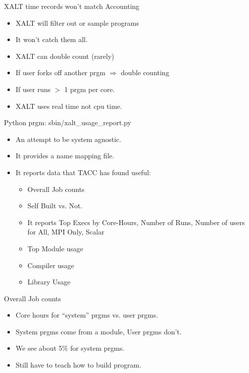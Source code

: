 \documentclass{beamer}
\begin{document}
\begin{frame}{XALT time records won't match Accounting}
  \begin{itemize}
    \item XALT will filter out or sample programs
    \item It won't catch them all.
    \item XALT can double count (rarely)
    \item If user forks off another prgm $\Rightarrow$ double counting
    \item If user runs $>$ 1 prgm per core.
    \item XALT uses real time not cpu time.
  \end{itemize}
\end{frame}

\begin{frame}{Python prgm: sbin/xalt\_usage\_report.py}
  \begin{itemize}
    \item An attempt to be system agnostic.
    \item It provides a name mapping file.
    \item It reports data that TACC has found useful:
      \begin{itemize}
        \item Overall Job counts
        \item Self Built vs. Not.
        \item It reports Top Execs by Core-Hours, Number of Runs,
          Number of users for All, MPI Only, Scalar
        \item Top Module usage
        \item Compiler usage
        \item Library Usage
      \end{itemize}
  \end{itemize}
\end{frame}

\begin{frame}{Overall Job counts}
  \begin{itemize}
    \item Core hours for ``system'' prgms vs. user prgms.
    \item System prgms come from a module, User prgms don't.
    \item We see about 5\% for system prgms.
    \item Still have to teach how to build program.
  \end{itemize}
\end{frame}
\end{document}
